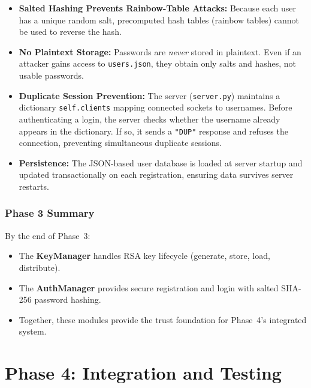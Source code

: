 \documentclass[12pt,a4paper]{article}
\begin{document}
\begin{itemize}
    \item \textbf{Salted Hashing Prevents Rainbow-Table Attacks:} Because each user has a unique random salt, precomputed hash tables (rainbow tables) cannot be used to reverse the hash.
    
    \item \textbf{No Plaintext Storage:} Passwords are \emph{never} stored in plaintext. Even if an attacker gains access to \texttt{users.json}, they obtain only salts and hashes, not usable passwords.
    
    \item \textbf{Duplicate Session Prevention:} The server (\texttt{server.py}) maintains a dictionary \texttt{self.clients} mapping connected sockets to usernames. Before authenticating a login, the server checks whether the username already appears in the dictionary. If so, it sends a \texttt{"DUP"} response and refuses the connection, preventing simultaneous duplicate sessions.
    
    \item \textbf{Persistence:} The JSON-based user database is loaded at server startup and updated transactionally on each registration, ensuring data survives server restarts.
\end{itemize}

\subsubsection{Phase 3 Summary}
By the end of Phase~3:
\begin{itemize}
    \item The \textbf{KeyManager} handles RSA key lifecycle (generate, store, load, distribute).
    \item The \textbf{AuthManager} provides secure registration and login with salted SHA-256 password hashing.
    \item Together, these modules provide the trust foundation for Phase~4's integrated system.
\end{itemize}

\newpage
\section{Phase 4: Integration and Testing}
\end{document}
